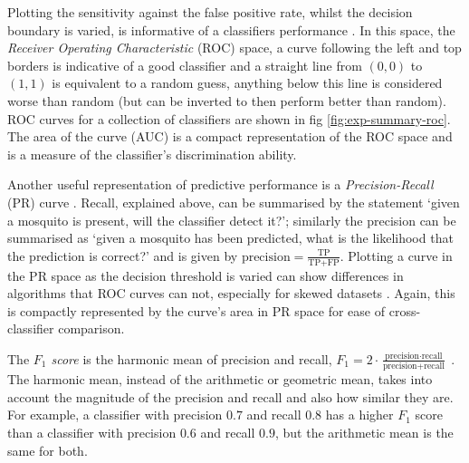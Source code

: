         \vspace{-1cm}
        Plotting the sensitivity against the false positive rate, whilst the decision boundary is varied, is informative of a classifiers performance \cite{Fawcett2005}. In this space, the \textit{Receiver Operating Characteristic} (ROC) space, a curve following the left and top borders is indicative of a good classifier and a straight line from $(0,0)$ to $(1,1)$ is equivalent to a random guess, anything below this line is considered worse than random (but can be inverted to then perform better than random). ROC curves for a collection of classifiers are shown in fig \ref{fig:exp-summary-roc}. The area of the curve (AUC) is a compact representation of the ROC space and is a measure of the classifier's discrimination ability.
        
        Another useful representation of predictive performance is a \textit{Precision-Recall} (PR) curve \cite{Raghavan1989}. Recall, explained above, can be summarised by the statement `given a mosquito is present, will the classifier detect it?'; similarly the precision can be summarised as `given a mosquito has been predicted, what is the likelihood that the prediction is correct?' and is given by $\text{precision} = \frac{\text{TP}}{\text{TP+FP}}$. Plotting a curve in the PR space as the decision threshold is varied can show differences in algorithms that ROC curves can not, especially for skewed datasets \cite{Davis}. Again, this is compactly represented by the curve's area in PR space for ease of cross-classifier comparison.
        
        The \textit{$F_1$ score} is the harmonic mean of precision and recall, $F_1 = 2\cdot\frac{\text{precision}\cdot \text{recall}}{\text{precision}+\text{recall}}$ . The harmonic mean, instead of the arithmetic or geometric mean, takes into account the magnitude of the precision and recall and also how similar they are. For example, a classifier with precision $0.7$ and recall $0.8$ has a higher $F_1$ score than a classifier with precision $0.6$ and recall $0.9$, but the arithmetic mean is the same for both.
        
        
